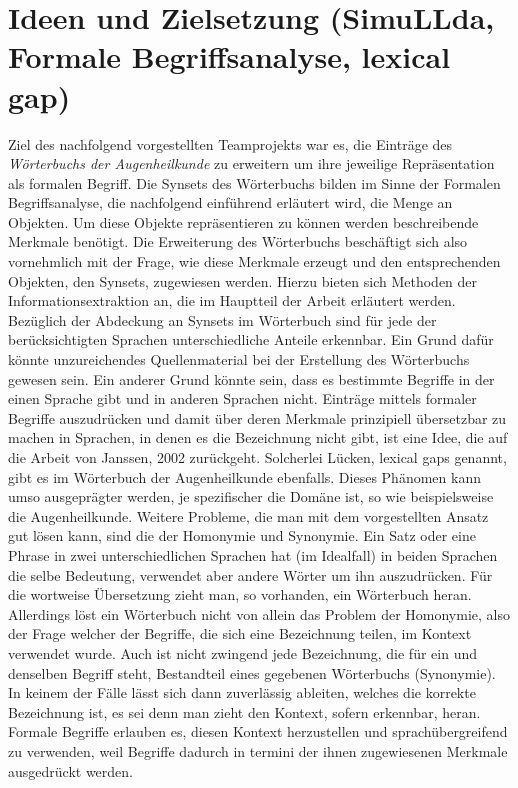 \documentclass[pagesize,DIV=calc,12pt,draft]{scrreprt}
\begin{document}
\section{Ideen und Zielsetzung (SimuLLda, Formale Begriffsanalyse, lexical gap)}

Ziel des nachfolgend vorgestellten Teamprojekts war es, die Einträge des \emph{Wörterbuchs der Augenheilkunde} zu erweitern um ihre jeweilige Repräsentation als formalen Begriff. 
Die Synsets des Wörterbuchs bilden im Sinne der Formalen Begriffsanalyse, die nachfolgend einführend erläutert wird, die Menge an Objekten. 
Um diese Objekte repräsentieren zu können werden beschreibende Merkmale benötigt. 
Die Erweiterung des Wörterbuchs beschäftigt sich also vornehmlich mit der Frage, wie diese Merkmale erzeugt und den entsprechenden Objekten, den Synsets, zugewiesen werden. 
Hierzu bieten sich Methoden der Informationsextraktion an, die im Hauptteil der Arbeit erläutert werden. 
Bezüglich der Abdeckung an Synsets im Wörterbuch sind für jede der berücksichtigten Sprachen unterschiedliche Anteile erkennbar. 
Ein Grund dafür könnte unzureichendes Quellenmaterial bei der Erstellung des Wörterbuchs gewesen sein. 
Ein anderer Grund könnte sein, dass es bestimmte Begriffe in der einen Sprache gibt und in anderen Sprachen nicht. 
Einträge mittels formaler Begriffe auszudrücken und damit über deren Merkmale prinzipiell übersetzbar zu machen in Sprachen, in denen es die Bezeichnung nicht gibt, ist eine Idee, die auf die Arbeit von Janssen, 2002 zurückgeht. 
Solcherlei Lücken, lexical gaps genannt, gibt es im Wörterbuch der Augenheilkunde ebenfalls. 
Dieses Phänomen kann umso ausgeprägter werden, je spezifischer die Domäne ist, so wie beispielsweise die Augenheilkunde. 
Weitere Probleme, die man mit dem vorgestellten Ansatz gut lösen kann, sind die der Homonymie und Synonymie. 
Ein Satz oder eine Phrase in zwei unterschiedlichen Sprachen hat (im Idealfall) in beiden Sprachen die selbe Bedeutung, verwendet aber andere Wörter um ihn auszudrücken. 
Für die wortweise Übersetzung zieht man, so vorhanden, ein Wörterbuch heran. 
Allerdings löst ein Wörterbuch nicht von allein das Problem der Homonymie, also der Frage welcher der Begriffe, die sich eine Bezeichnung teilen, im Kontext verwendet wurde. 
Auch ist nicht zwingend jede Bezeichnung, die für ein und denselben Begriff steht, Bestandteil eines gegebenen Wörterbuchs (Synonymie). 
In keinem der Fälle lässt sich dann zuverlässig ableiten, welches die korrekte Bezeichnung ist, es sei denn man zieht den Kontext, sofern erkennbar, heran. 
Formale Begriffe erlauben es, diesen Kontext herzustellen und sprachübergreifend zu verwenden, weil Begriffe dadurch in termini der ihnen zugewiesenen Merkmale ausgedrückt werden. 
\end{document}
